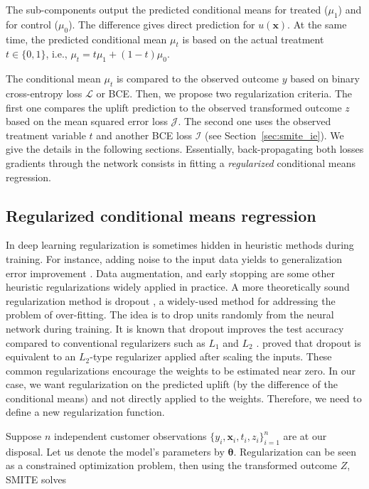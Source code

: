 \documentclass{article}
\def\x{\mathbf x}
\begin{document}


The sub-components output the predicted conditional means for treated ($\mu_1$) and for control ($\mu_0$). The difference gives direct prediction for $u(\x)$. At the same time, the predicted conditional mean $\mu_t$ is based on the actual treatment $t \in \{0,1\}$, i.e., $\mu_t = t\mu_1 + (1-t)\mu_0$. 

The conditional mean $\mu_t$ is compared to the observed outcome $y$ based on binary cross-entropy loss $\mathcal{L}$ or BCE. Then, we propose two regularization criteria. The first one compares the uplift prediction to the observed transformed outcome $z$ based on the mean squared error loss $\mathcal{J}$. The second one uses the observed treatment variable $t$ and another BCE loss $\mathcal{I}$ (see Section~\ref{sec:smite_ie}). We give the details in the following sections. Essentially, back-propagating both losses gradients through the network consists in fitting a {\it regularized} conditional means regression.

\subsection{Regularized conditional means regression}
\label{sec:smite_to}

In deep learning regularization is sometimes hidden in heuristic methods during training. For instance, adding noise to the input data yields to generalization error improvement \citep{bishop1995training,rifai2011adding}. Data augmentation, and early stopping are some other heuristic regularizations widely applied in practice. A more theoretically sound regularization method is dropout \citep{srivastava2014dropout}, a widely-used method for addressing the problem of over-fitting. The idea is to drop units randomly from the neural network during training. It is known that dropout improves the test accuracy compared to conventional regularizers such as $L_1$ \citep{Tibshirani_lasso_1996} and $L_2$  \citep{srivastava2014dropout}. \citep{wager2013dropout} proved that dropout is equivalent to an $L_2$-type regularizer applied after scaling the inputs. These common regularizations encourage the weights to be estimated near zero. In our case, we want regularization on the predicted uplift (by the difference of the conditional means) and not directly applied to the weights. Therefore, we need to define a new regularization function. 

Suppose $n$ independent customer observations $\{y_i, \textbf{x}_i, t_i, z_i\}_{i=1}^n$ are at our disposal. Let us denote the model's parameters by $\boldsymbol{\theta}$. Regularization can be seen as a constrained optimization problem, then using the transformed outcome $Z$, SMITE solves
\end{document}
